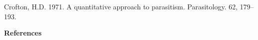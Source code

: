 \documentclass[12pt, a4paper]{article}
\begin{document}








\bigskip

Crofton, H.D. 1971. A quantitative approach to parasitism. Parasitology. 62, 179–193.

\textbf{References}
\end{document}
